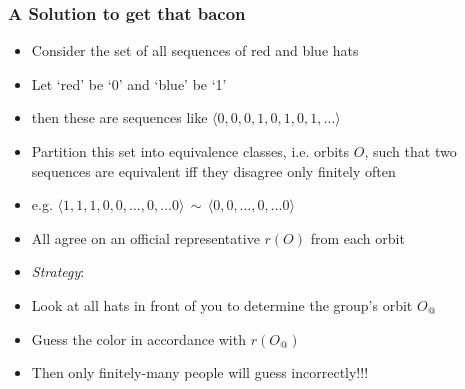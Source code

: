 \begin{frame}
\frametitle{A Solution to get that bacon}

\begin{itemize}[<+->]

\item Consider the set of all sequences of red and blue hats

\bi
\item Let `red' be `0' and `blue' be `1'

\item then these are sequences like $\langle 0, 0, 0, 1, 0, 1, 0, 1, \dots \rangle$
\ei

\bigskip

\item Partition this set into equivalence classes, i.e. orbits $O$, such that two sequences are equivalent iff they disagree only finitely often
\item[] e.g. $\langle 1, 1, 1, 0, 0, \dots, 0, \dots 0 \rangle \, \sim \, \langle 0, 0, \dots, 0, \dots 0 \rangle$

\item All agree on an official representative \emph{$r(O)$} from each orbit

\item \textit{Strategy}:
\bi
\item Look at all hats in front of you to determine the group's orbit $O_{@}$
\item Guess the color in accordance with $r(O_{@})$
\item Then only finitely-many people will guess incorrectly!!!
\ei

\end{itemize}
\end{frame}

